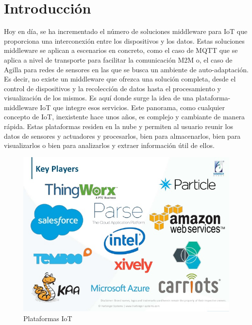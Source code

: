 \documentclass[12pt, twoside]{book}
\begin{document}
\section{Introducción}
Hoy en día, se ha incrementado el número de soluciones middleware para IoT que proporciona una interconexión entre los dispositivos y los datos. Estas soluciones middleware se aplican a escenarios en concreto, como el caso de MQTT que se aplica a nivel de transporte para facilitar la comunicación M2M o, el caso de Agilla para redes de sensores en las que se busca un ambiente de auto-adaptación. Es decir, no existe un middleware que ofrezca una solución completa, desde el control de dispositivos  y la recolección de datos hasta el procesamiento y visualización de los mismos. Es aquí donde surge la idea de una plataforma-middleware IoT\cite{platform_gap} que integre esos servicios. Este panorama, como cualquier concepto de IoT, inexistente hace unos años, es complejo y cambiante de manera rápida. Estas plataformas residen en la nube y permiten al usuario reunir los datos de sensores y actuadores y procesarlos, bien para almacenarlos, bien para visualizarlos o bien para analizarlos y extraer información útil de ellos.
\begin{figure}[H]
\centering
\includegraphics[scale=0.3]{images/platforms_iot}
\caption{Plataformas IoT}\label{platforms_iot}
\end{figure}
\end{document}
